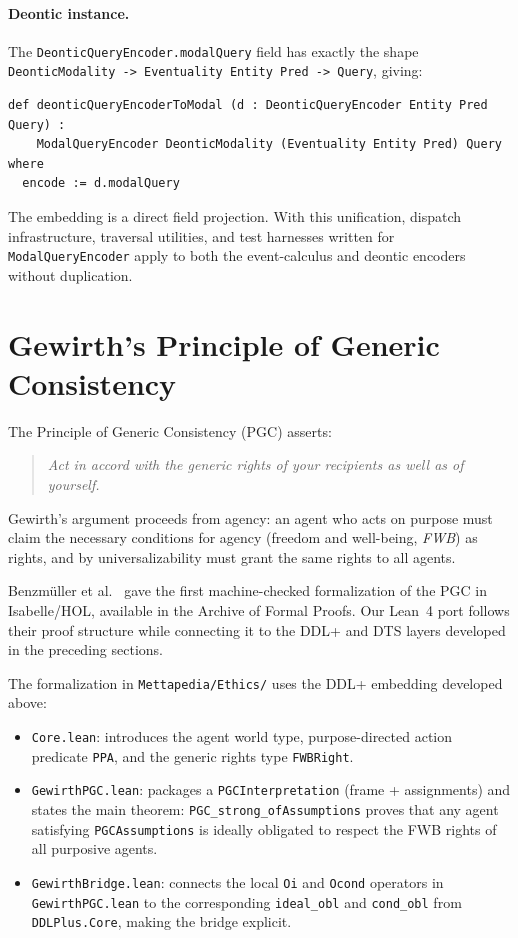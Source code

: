 \documentclass[]{article}
\newcommand{\code}[1]{\texttt{#1}}
\newcommand{\DDL}{\textup{DDL+}}
\newcommand{\DTS}{\textup{DTS}}
\newcommand{\PGC}{\textup{PGC}}
\begin{document}
\paragraph{Deontic instance.}
The \code{DeonticQueryEncoder.modalQuery} field has exactly the shape
\code{DeonticModality -> Eventuality Entity Pred -> Query}, giving:

\begin{lstlisting}
def deonticQueryEncoderToModal (d : DeonticQueryEncoder Entity Pred Query) :
    ModalQueryEncoder DeonticModality (Eventuality Entity Pred) Query where
  encode := d.modalQuery
\end{lstlisting}

\noindent
The embedding is a direct field projection.
With this unification, dispatch infrastructure, traversal utilities, and
test harnesses written for \code{ModalQueryEncoder} apply to both the
event-calculus and deontic encoders without duplication.

\section{Gewirth's Principle of Generic Consistency}
\label{sec:pgc}

The Principle of Generic Consistency (\PGC{}) \cite{Gewirth1978} asserts:
\begin{quote}
\emph{Act in accord with the generic rights of your recipients as well as of yourself.}
\end{quote}
Gewirth's argument proceeds from agency: an agent who acts on purpose must
claim the necessary conditions for agency (freedom and well-being, \emph{FWB})
as rights, and by universalizability must grant the same rights to all agents.

Benzm{\"u}ller et al.\ \cite{Benzmuller2019PGC} gave the first machine-checked
formalization of the \PGC{} in Isabelle/HOL, available in the Archive of Formal Proofs.
Our Lean~4 port follows their proof structure while connecting it to the \DDL{}
and \DTS{} layers developed in the preceding sections.

The formalization in \code{Mettapedia/Ethics/} uses the \DDL{} embedding
developed above:

\begin{itemize}
\item \code{Core.lean}: introduces the agent world type, purpose-directed
      action predicate \code{PPA}, and the generic rights type \code{FWBRight}.
\item \code{GewirthPGC.lean}: packages a \code{PGCInterpretation} (frame +
      assignments) and states the main theorem:
      \code{PGC\_strong\_ofAssumptions} proves that any agent satisfying
      \code{PGCAssumptions} is ideally obligated to respect the FWB rights
      of all purposive agents.
\item \code{GewirthBridge.lean}: connects the local \code{Oi} and \code{Ocond}
      operators in \code{GewirthPGC.lean} to the corresponding \code{ideal\_obl}
      and \code{cond\_obl} from \code{DDLPlus.Core}, making the bridge explicit.
\end{itemize}
\end{document}
